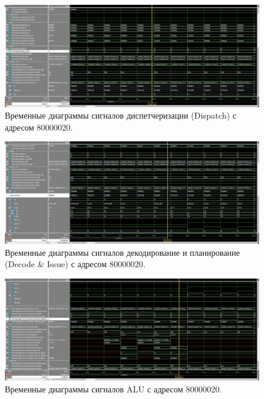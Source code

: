 \begin{figure}[h]
	\centering
	\includegraphics[height=0.3\textheight]{img/dispatch}
	\caption{Временные диаграммы сигналов диспетчеризации (Dispatch) с адресом 80000020.}
	\label{img:dispatch}
\end{figure}

\begin{figure}[h]
	\centering
	\includegraphics[height=0.3\textheight]{img/decode}
	\caption{Временные диаграммы сигналов декодирование и планирование (Decode \& Issue) с адресом 80000020.}
	\label{img:decode}
\end{figure}

\begin{figure}[h]
	\centering
	\includegraphics[height=0.3\textheight]{img/alu}
	\caption{Временные диаграммы сигналов ALU с адресом 80000020.}
	\label{img:alu}
\end{figure}

\clearpage

